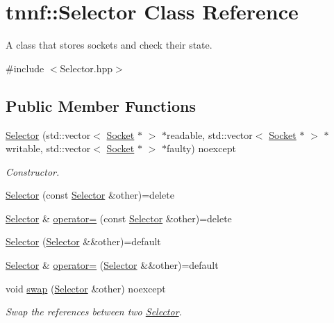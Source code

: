 \hypertarget{classtnnf_1_1_selector}{}\section{tnnf\+:\+:Selector Class Reference}
\label{classtnnf_1_1_selector}


A class that stores sockets and check their state.  




{\ttfamily \#include $<$Selector.\+hpp$>$}

\subsection*{Public Member Functions}
\begin{DoxyCompactItemize}
\item 
\hyperlink{classtnnf_1_1_selector_ad44212d90a740edcae51222804be7d3d}{Selector} (std\+::vector$<$ \hyperlink{classtnnf_1_1_socket}{Socket} $\ast$ $>$ $\ast$readable, std\+::vector$<$ \hyperlink{classtnnf_1_1_socket}{Socket} $\ast$ $>$ $\ast$writable, std\+::vector$<$ \hyperlink{classtnnf_1_1_socket}{Socket} $\ast$ $>$ $\ast$faulty) noexcept
\begin{DoxyCompactList}\small\item\em Constructor. \end{DoxyCompactList}\item 
\hyperlink{classtnnf_1_1_selector_a7e0a7480a3f855ad7d44d66526ca2469}{Selector} (const \hyperlink{classtnnf_1_1_selector}{Selector} \&other)=delete
\item 
\hyperlink{classtnnf_1_1_selector}{Selector} \& \hyperlink{classtnnf_1_1_selector_a3ebb12aa609b185a9c97839fc971e8ce}{operator=} (const \hyperlink{classtnnf_1_1_selector}{Selector} \&other)=delete
\item 
\hyperlink{classtnnf_1_1_selector_a896624fea5063418b97436b095f4dbd1}{Selector} (\hyperlink{classtnnf_1_1_selector}{Selector} \&\&other)=default
\item 
\hyperlink{classtnnf_1_1_selector}{Selector} \& \hyperlink{classtnnf_1_1_selector_aa97bc7597c45daa4873003978e31fbb3}{operator=} (\hyperlink{classtnnf_1_1_selector}{Selector} \&\&other)=default
\item 
void \hyperlink{classtnnf_1_1_selector_ab2b2bf232079c169a5f28616c54d6e97}{swap} (\hyperlink{classtnnf_1_1_selector}{Selector} \&other) noexcept
\begin{DoxyCompactList}\small\item\em Swap the references between two \hyperlink{classtnnf_1_1_selector}{Selector}. \end{DoxyCompactList}\item 

\end{DoxyCompactItemize}
